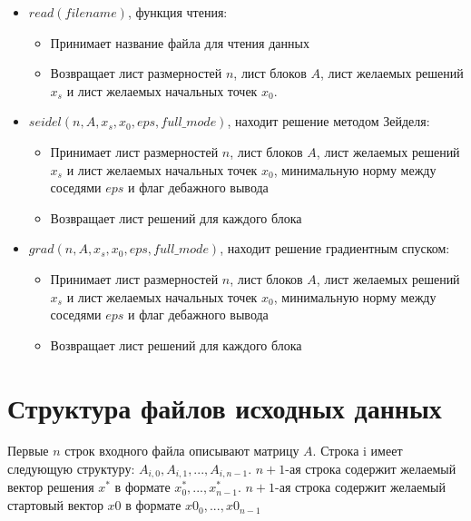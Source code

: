 \documentclass[paper=a4, fontsize=11pt]{scrartcl} %
\numberwithin{equation}{section} %
\numberwithin{figure}{section} %
\numberwithin{table}{section} %
\begin{document}
\begin{itemize}
	\item $read(filename)$, функция чтения:
		\begin{itemize}
		\item Принимает название файла для чтения данных
		\item Возвращает лист размерностей $n$, лист блоков $A$, лист желаемых решений $x_s$ и лист желаемых начальных точек $x_0$.
		\end{itemize}
	\item $seidel(n, A, x_s, x_0, eps, full\_mode)$, находит решение методом Зейделя:
		\begin{itemize}
		\item Принимает  лист размерностей $n$, лист блоков $A$, лист желаемых решений $x_s$ и лист желаемых начальных точек $x_0$, минимальную норму между соседями $eps$ и флаг дебажного вывода
		\item Возвращает лист решений для каждого блока
		\end{itemize}
    \item $grad(n, A, x_s, x_0, eps, full\_mode)$, находит решение градиентным спуском:
        \begin{itemize}
		\item Принимает  лист размерностей $n$, лист блоков $A$, лист желаемых решений $x_s$ и лист желаемых начальных точек $x_0$, минимальную норму между соседями $eps$ и флаг дебажного вывода
		\item Возвращает лист решений для каждого блока
		\end{itemize}
\end{itemize}



\section{Структура файлов исходных данных}

Первые $n$ строк входного файла описывают матрицу $A$. Строка i имеет следующую структуру: $A_{i,0}, A_{i,1},..., A_{i,n - 1}$. 
$n+1$-ая строка содержит желаемый вектор решения $x^*$ в формате $x^*_{0}, ..., x^*_{n - 1}$.
$n+1$-ая строка содержит желаемый стартовый вектор $x0$ в формате $x0_{0}, ..., x0_{n - 1}$
\end{document}
